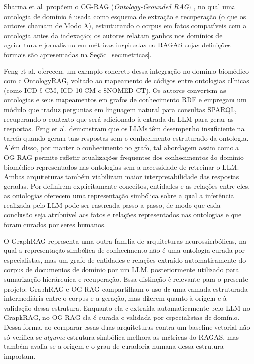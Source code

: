 \documentclass{article}
\begin{document}
	Sharma et al. propõem o OG-RAG (\textit{Ontology-Grounded RAG}) \cite{sharma2025ograg}, no qual uma ontologia de domínio é usada como esquema de extração e recuperação (o que os autores chamam de Modo A), estruturando o corpus em fatos compatíveis com a ontologia antes da indexação; os autores relatam ganhos nos domínios de agricultura e jornalismo em métricas inspiradas no RAGAS  cujas definições formais são apresentadas na Seção~\ref{sec:metricas}. %
	
	Feng et al. \cite{feng2025ontologyrag} oferecem um exemplo concreto dessa integração no domínio biomédico com o OntologyRAG, voltado ao mapeamento de códigos entre ontologias clínicas (como ICD-9-CM, ICD-10-CM e SNOMED CT). Os autores convertem as ontologias e seus mapeamentos em grafos de conhecimento RDF e empregam um módulo que traduz perguntas em linguagem natural para consultas SPARQL, recuperando o contexto que será adicionado à entrada da LLM para gerar as respostas. Feng et al. \cite{feng2025ontologyrag} demonstram que os LLMs têm desempenho insuficiente na tarefa quando geram tais respostas sem o conhecimento estruturado da ontologia. Além disso, por manter o conhecimento no grafo, tal abordagem assim como a OG RAG \cite{sharma2025ograg} permite refletir atualizações frequentes dos conhecimentos do domínio biomédico representados nas ontologias sem a necessidade de retreinar o LLM. Ambas arquiteturas também viabilizam maior interpretabilidade das respostas geradas. Por definirem explicitamente conceitos, entidades e as relações entre eles, as ontologias oferecem uma representação simbólica sobre a qual a inferência realizada pelo LLM pode ser rastreada passo a passo, de modo que cada conclusão seja atribuível aos fatos e relações representados nas ontologias e que foram curados por seres humanos.
	
	O GraphRAG \cite{edge2024graphrag} representa uma outra família de arquiteturas neurossimbólicas, na qual a representação simbólica de conhecimento não é uma ontologia curada por especialistas, mas um grafo de entidades e relações extraído automaticamente do corpus de documentos de domínio por um LLM, posteriormente utilizado para sumarização hierárquica e recuperação. Essa distinção é relevante para o presente projeto: GraphRAG e OG-RAG compartilham o uso de uma camada estruturada intermediária entre o corpus e a geração, mas diferem quanto à origem e à validação dessa estrutura. Enquanto ela é extraída automaticamente pelo LLM no GraphRAG, no OG RAG ela é curada e validada por especialistas de domínio. Dessa forma, ao comparar essas duas arquiteturas contra um baseline vetorial não só verifica se \emph{alguma} estrutura simbólica melhora as métricas do RAGAS, mas também avalia se a origem e o grau de curadoria  humana dessa estrutura importam.
	
\end{document}
